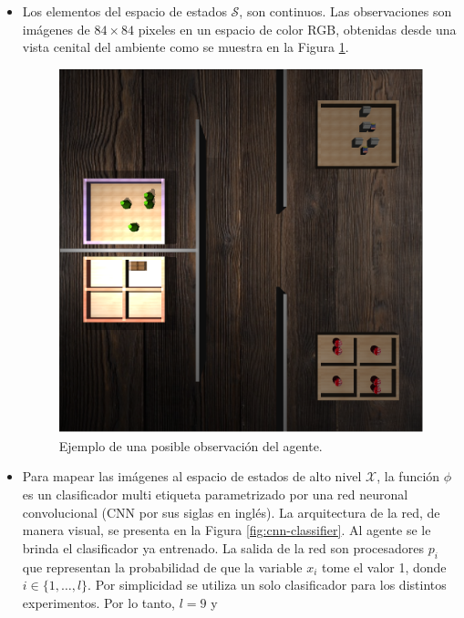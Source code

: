 \begin{itemize}
    \item Los elementos del espacio de estados $\mathcal{S}$, son continuos.
    Las observaciones son imágenes de $84\times 84$ pixeles en un espacio de color RGB, obtenidas desde una vista cenital del ambiente como se muestra en la Figura \ref{fig:obs-example-lights}.
    
    \begin{figure}[H]
        \centering
        \includegraphics[scale=0.2]{Chapter5/Figs/obs_example.png}
        \caption{Ejemplo de una posible observación del agente.}
        \label{fig:obs-example-lights}
    \end{figure}
    \item Para mapear las imágenes al espacio de estados de alto nivel $\mathcal{X}$, la función $\phi$ es un clasificador multi etiqueta
    parametrizado por una red neuronal convolucional \cite{Goodfellow-et-al-2016} (CNN por sus siglas en inglés). La arquitectura de la red, de manera visual, se presenta en la Figura \ref{fig:cnn-classifier}. Al agente se le brinda el clasificador ya entrenado.
    La salida de la red son procesadores $p_i$ que
    representan la probabilidad de que la variable $x_i$ tome el valor 1, donde
    $i \in \{1, \dots, l\}$. Por simplicidad se utiliza un solo
    clasificador para los distintos experimentos. Por lo tanto, $l = 9$ y

\end{itemize}
